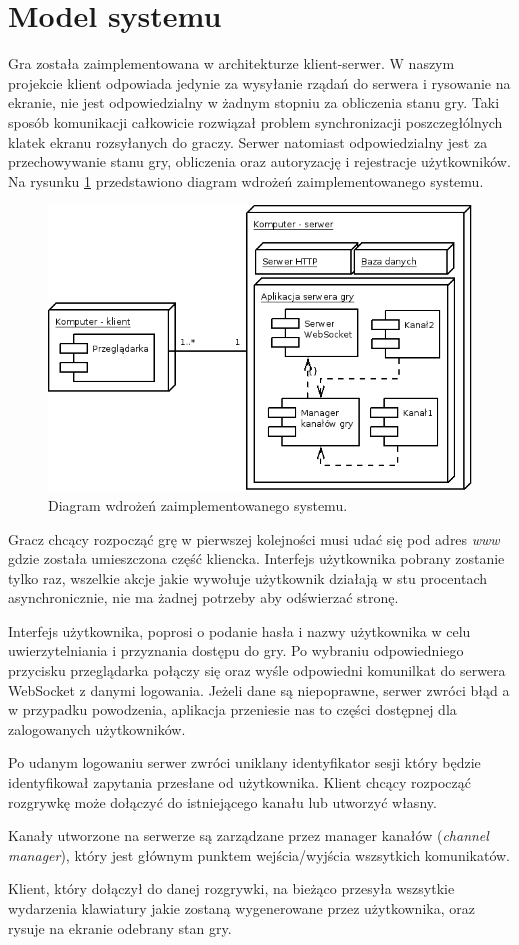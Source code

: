 \section{Model systemu}
Gra została zaimplementowana w architekturze klient-serwer. W naszym projekcie klient odpowiada jedynie za wysyłanie rządań do serwera i rysowanie na ekranie, nie jest odpowiedzialny w żadnym stopniu za obliczenia stanu gry. Taki sposób komunikacji całkowicie rozwiązał problem synchronizacji poszczegłólnych klatek ekranu rozsyłanych do graczy. Serwer natomiast odpowiedzialny jest za przechowywanie stanu gry, obliczenia oraz autoryzację i rejestracje użytkowników. Na rysunku \ref{fig:ddiag} przedstawiono diagram wdrożeń zaimplementowanego systemu.

\begin{figure}[ht]
    \centering
    \includegraphics[scale=0.5]{imgs/ddiagram.png}
    \caption{Diagram wdrożeń zaimplementowanego systemu.}
    \label{fig:ddiag}
\end{figure}

Gracz chcący rozpocząć grę w pierwszej kolejności musi udać się pod adres \emph{www} gdzie została umieszczona część kliencka. Interfejs użytkownika pobrany zostanie tylko raz, wszelkie akcje jakie wywołuje użytkownik działają w stu procentach asynchronicznie, nie ma żadnej potrzeby aby odświerzać stronę.

Interfejs użytkownika, poprosi o podanie hasła i nazwy użytkownika w celu uwierzytelniania i przyznania dostępu do gry. Po wybraniu odpowiedniego przycisku przeglądarka połączy się oraz wyśle odpowiedni komunilkat do serwera WebSocket z danymi logowania. Jeżeli dane są niepoprawne, serwer zwróci błąd a w przypadku powodzenia, aplikacja przeniesie nas to części dostępnej dla zalogowanych użytkowników.

Po udanym logowaniu serwer zwróci uniklany identyfikator sesji który będzie identyfikował zapytania przesłane od użytkownika. Klient chcący rozpocząć rozgrywkę może dołączyć do istniejącego kanału lub utworzyć własny.

Kanały utworzone na serwerze są zarządzane przez manager kanałów (\emph{channel manager}), który jest głównym punktem wejścia/wyjścia wszsytkich komunikatów.

Klient, który dołączył do danej rozgrywki, na bieżąco przesyła wszsytkie wydarzenia klawiatury jakie zostaną wygenerowane przez użytkownika, oraz rysuje na ekranie odebrany stan gry.
